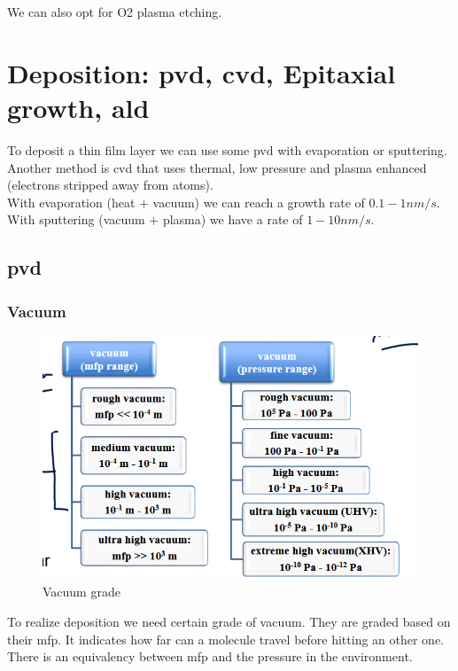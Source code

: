 \documentclass{report}
\begin{document}
We can also opt for O2 plasma etching.

\chapter{Deposition: \gls{pvd}, \gls{cvd}, Epitaxial growth, \gls{ald}}

To deposit a thin film layer we can use some \gls{pvd} with evaporation or sputtering. Another method is \gls{cvd} that uses thermal, low pressure and plasma enhanced (electrons stripped away from atoms).\\

With evaporation (heat + vacuum) we can reach a growth rate of $0.1-1 nm/s$. With sputtering (vacuum + plasma) we have a rate of $1-10nm/s$.

\section{\gls{pvd}}

\subsection{Vacuum}

\begin{figure}
    \centering
    \includegraphics[width=0.95\linewidth]{vacuum.png}
    \caption{Vacuum grade}
    \label{fig:vacuum-label}
\end{figure}

To realize deposition we need certain grade of vacuum. They are graded based on their \gls{mfp}. It indicates how far can a molecule travel before hitting an other one. There is an equivalency between \gls{mfp} and the pressure in the environment. 
\end{document}
